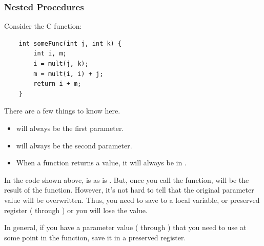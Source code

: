 \documentclass[letterpaper]{article}
\begin{document}
\subsubsection{Nested Procedures}
Consider the C function:
\begin{verbatim}
    int someFunc(int j, int k) {
        int i, m; 
        i = mult(j, k);
        m = mult(i, i) + j;
        return i + m;
    }
\end{verbatim}
There are a few things to know here.
\begin{itemize}
    \item {} will always be the first parameter. 
    \item {} will always be the second parameter. 
    \item When a function returns a value, it will always be in .
\end{itemize}
In the code shown above,  is  as  is . But, once you call the  function,  will be the result of the  function. However, it's not hard to tell that the original parameter value  will be overwritten. Thus, you need to save  to a local variable, or preserved register ( through ) or you will lose the value. 

\bigskip 

In general, if you have a parameter value ( through ) that you need to use at some point in the function, save it in a preserved register. 
\end{document}

